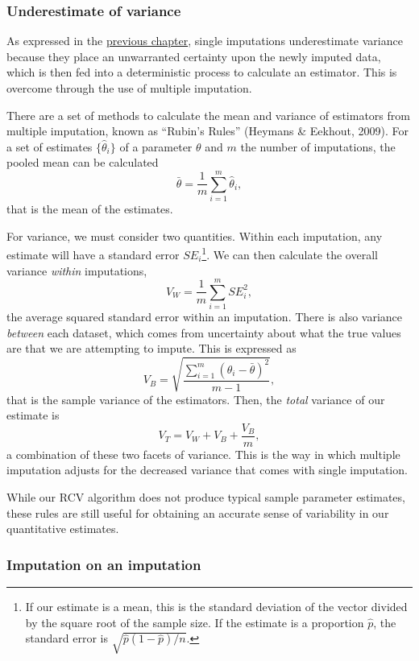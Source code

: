 \documentclass[12pt,twoside]{reedthesis}
\begin{document}
\hypertarget{rubins-rules}{%
\subsubsection{Underestimate of variance}\label{rubins-rules}}

As expressed in the \protect\hyperlink{missing-litreview}{previous chapter}, single imputations underestimate variance because they place an unwarranted certainty upon the newly imputed data, which is then fed into a deterministic process to calculate an estimator. This is overcome through the use of multiple imputation.

There are a set of methods to calculate the mean and variance of estimators from multiple imputation, known as ``Rubin's Rules'' (Heymans \& Eekhout, 2009). For a set of estimates \(\{\hat{\theta}_i\}\) of a parameter \(\theta\) and \(m\) the number of imputations, the pooled mean can be calculated
\[
\bar{\theta} = \frac{1}{m} \sum_{i=1}^m \hat{\theta}_i,
\]
that is the mean of the estimates.

For variance, we must consider two quantities. Within each imputation, any estimate will have a standard error \(SE_i\)\footnote{If our estimate is a mean, this is the standard deviation of the vector divided by the square root of the sample size. If the estimate is a proportion \(\hat{p}\), the standard error is \(\sqrt{\hat{p} (1 - \hat{p}) / n}\).}. We can then calculate the overall variance \emph{within} imputations,
\[
V_W = \frac{1}{m} \sum_{i=1}^m SE_i^2,
\]
the average squared standard error within an imputation. There is also variance \emph{between} each dataset, which comes from uncertainty about what the true values are that we are attempting to impute. This is expressed as
\[
V_B = \sqrt{\frac{\sum_{i=1}^m (\theta_i - \bar{\theta})^2}{m-1}},
\]
that is the sample variance of the estimators. Then, the \emph{total} variance of our estimate is
\[
V_T = V_W + V_B + \frac{V_B}{m},
\]
a combination of these two facets of variance. This is the way in which multiple imputation adjusts for the decreased variance that comes with single imputation.

While our RCV algorithm does not produce typical sample parameter estimates, these rules are still useful for obtaining an accurate sense of variability in our quantitative estimates.

\hypertarget{imputation-on-an-imputation}{%
\subsubsection{Imputation on an imputation}\label{imputation-on-an-imputation}}
\end{document}
